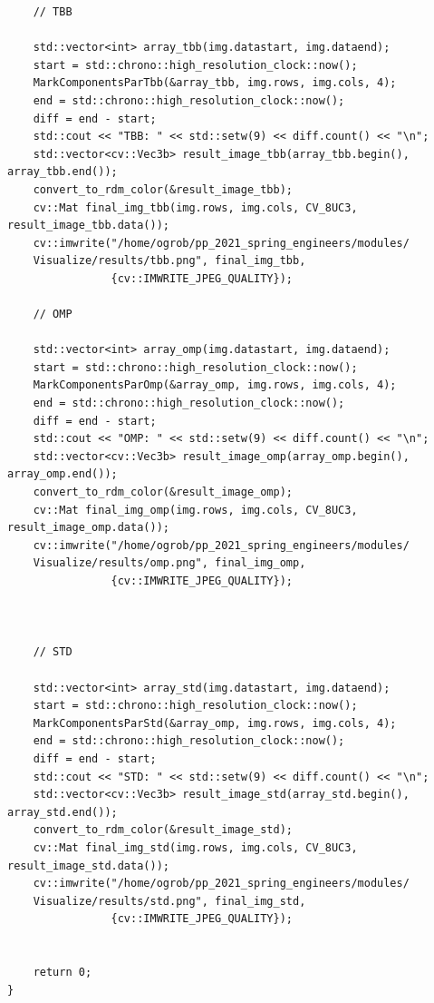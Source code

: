\documentclass{report}
\begin{document}
\begin{lstlisting}
    // TBB

    std::vector<int> array_tbb(img.datastart, img.dataend);
    start = std::chrono::high_resolution_clock::now();
    MarkComponentsParTbb(&array_tbb, img.rows, img.cols, 4);
    end = std::chrono::high_resolution_clock::now();
    diff = end - start;
    std::cout << "TBB: " << std::setw(9) << diff.count() << "\n";
    std::vector<cv::Vec3b> result_image_tbb(array_tbb.begin(), array_tbb.end());
    convert_to_rdm_color(&result_image_tbb);
    cv::Mat final_img_tbb(img.rows, img.cols, CV_8UC3, result_image_tbb.data());
    cv::imwrite("/home/ogrob/pp_2021_spring_engineers/modules/
    Visualize/results/tbb.png", final_img_tbb,
                {cv::IMWRITE_JPEG_QUALITY});

    // OMP

    std::vector<int> array_omp(img.datastart, img.dataend);
    start = std::chrono::high_resolution_clock::now();
    MarkComponentsParOmp(&array_omp, img.rows, img.cols, 4);
    end = std::chrono::high_resolution_clock::now();
    diff = end - start;
    std::cout << "OMP: " << std::setw(9) << diff.count() << "\n";
    std::vector<cv::Vec3b> result_image_omp(array_omp.begin(), array_omp.end());
    convert_to_rdm_color(&result_image_omp);
    cv::Mat final_img_omp(img.rows, img.cols, CV_8UC3, result_image_omp.data());
    cv::imwrite("/home/ogrob/pp_2021_spring_engineers/modules/
    Visualize/results/omp.png", final_img_omp,
                {cv::IMWRITE_JPEG_QUALITY});



    // STD

    std::vector<int> array_std(img.datastart, img.dataend);
    start = std::chrono::high_resolution_clock::now();
    MarkComponentsParStd(&array_omp, img.rows, img.cols, 4);
    end = std::chrono::high_resolution_clock::now();
    diff = end - start;
    std::cout << "STD: " << std::setw(9) << diff.count() << "\n";
    std::vector<cv::Vec3b> result_image_std(array_std.begin(), array_std.end());
    convert_to_rdm_color(&result_image_std);
    cv::Mat final_img_std(img.rows, img.cols, CV_8UC3, result_image_std.data());
    cv::imwrite("/home/ogrob/pp_2021_spring_engineers/modules/
    Visualize/results/std.png", final_img_std,
                {cv::IMWRITE_JPEG_QUALITY});


    return 0;
}

\end{lstlisting}
\end{document}
